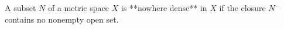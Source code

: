 A subset $N$ of a metric space $X$ is **nowhere dense** in $X$ if the closure $N^-$ contains no nonempty open set.
